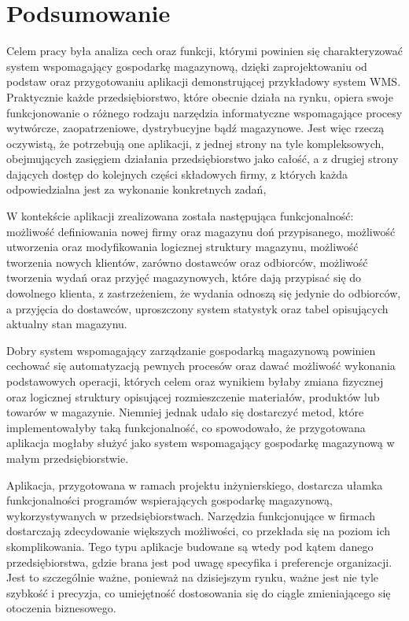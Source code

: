 \chapter{Podsumowanie}
\label{c7:c7}
	Celem pracy była analiza cech oraz funkcji, którymi powinien się charakteryzować system
	wspomagający gospodarkę magazynową, dzięki zaprojektowaniu od podstaw oraz 
	przygotowaniu aplikacji demonstrującej przykładowy system WMS. Praktycznie każde przedsiębiorstwo, które obecnie działa na rynku,
	opiera swoje funkcjonowanie o różnego rodzaju narzędzia informatyczne wspomagające procesy wytwórcze, zaopatrzeniowe, dystrybucyjne
	bądź magazynowe. Jest więc rzeczą oczywistą, że potrzebują one aplikacji, z jednej strony na tyle kompleksowych, 
	obejmujących zasięgiem działania przedsiębiorstwo jako całość, a z drugiej strony dających dostęp
	do kolejnych części składowych firmy, z których każda odpowiedzialna jest za wykonanie konkretnych zadań,
	
	W kontekście aplikacji zrealizowana została następująca funkcjonalność: 
	możliwość defi\-niowania nowej firmy oraz magazynu doń przypisanego,
	możliwość utworzenia oraz modyfikowania logicznej struktury magazynu,
	możliwość tworzenia nowych klientów, zarówno dostawców oraz odbiorców,
	możliwość tworzenia wydań oraz przyjęć magazynowych, które dają przypisać się do dowolnego klienta,
	z zastrzeżeniem, że wydania odnoszą się jedynie do odbiorców, a przyjęcia do dostawców,
	uproszczony system statystyk oraz tabel opisujących aktualny stan magazynu. 	

	Dobry system wspomagający zarządzanie gospodarką magazynową powinien
	cechować się automatyzacją pewnych procesów oraz dawać możliwość wykonania
	podstawowych operacji, których celem oraz wynikiem byłaby zmiana fizycznej oraz logicznej struktury
	opisującej rozmieszczenie materiałów, produktów lub towarów w magazynie.
	Niemniej jednak udało się dostarczyć metod, które implementowałyby taką funkcjonalność, co spowodowało,
	że przygotowana aplikacja mogłaby służyć jako system wspomagający gospodarkę magazynową w 
	małym przedsiębiorstwie.
	
	Aplikacja, przygotowana w ramach projektu inżynierskiego, dostarcza ułamka funkcjonalności
	programów wspierających gospodarkę magazynową, wykorzystywanych w przedsiębiorstwach. 
	Narzędzia funkcjonujące w firmach dostarczają zdecydowanie większych możliwości, co przekłada się na poziom
	ich skomplikowania. Tego typu aplikacje budowane są wtedy pod kątem danego przedsiębiorstwa, gdzie brana jest
	pod uwagę specyfika i preferencje organizacji. Jest to szczególnie ważne, ponieważ na dzisiejszym
	rynku, ważne jest nie tyle szybkość i precyzja, co umiejętność dostosowania się
	do ciągle zmieniającego się otoczenia biznesowego.
	
